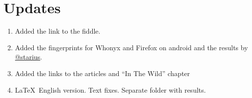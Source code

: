 \documentclass[letterpaper,14pt]{article}
\begin{document}
\nocite{*}
\printbibliography[heading=bibnumbered]


\section{Updates}\label{updates}
\begin{enumerate}
\itemsep1pt\parskip0pt
\item
  Added the link to the fiddle.
\item
  Added the fingerprints for Whonyx and Firefox on android and the
  results by \href{https://geektimes.ru/users/starius/}{@starius}.
\item
  Added the links to the articles and ``In The Wild'' chapter
\item
   \LaTeX\ English version. Text fixes. Separate folder with results.
\end{enumerate}


{\footnotesize}
\appendix
\end{document}
